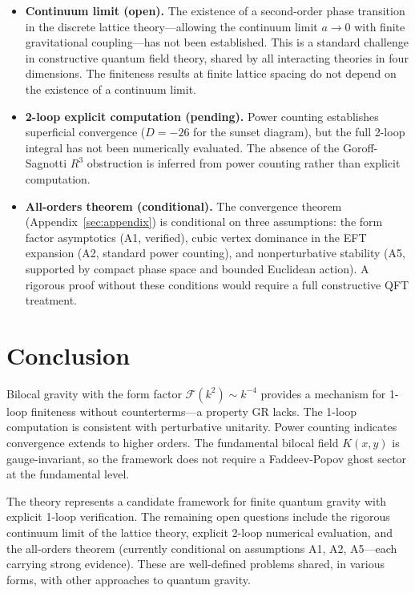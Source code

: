 \documentclass[aps,prd,reprint,nofootinbib]{revtex4-2}
\begin{document}
\begin{itemize}
\item \textbf{Continuum limit (open).} The existence of a second-order phase transition in the discrete lattice theory---allowing the continuum limit $a\to 0$ with finite gravitational coupling---has not been established. This is a standard challenge in constructive quantum field theory, shared by all interacting theories in four dimensions. The finiteness results at finite lattice spacing do not depend on the existence of a continuum limit.
\item \textbf{2-loop explicit computation (pending).} Power counting establishes superficial convergence ($D = -26$ for the sunset diagram), but the full 2-loop integral has not been numerically evaluated. The absence of the Goroff-Sagnotti $R^3$ obstruction is inferred from power counting rather than explicit computation.
\item \textbf{All-orders theorem (conditional).} The convergence theorem (Appendix~\ref{sec:appendix}) is conditional on three assumptions: the form factor asymptotics (A1, verified), cubic vertex dominance in the EFT expansion (A2, standard power counting), and nonperturbative stability (A5, supported by compact phase space and bounded Euclidean action). A rigorous proof without these conditions would require a full constructive QFT treatment.
\end{itemize}

\section{Conclusion}
\label{sec:conclusion}

Bilocal gravity with the form factor $\mathcal{F}(k^2) \sim k^{-4}$ provides a mechanism for 1-loop finiteness without counterterms---a property GR lacks. The 1-loop computation is consistent with perturbative unitarity. Power counting indicates convergence extends to higher orders. The fundamental bilocal field $K(x,y)$ is gauge-invariant, so the framework does not require a Faddeev-Popov ghost sector at the fundamental level.

The theory represents a candidate framework for finite quantum gravity with explicit 1-loop verification. The remaining open questions include the rigorous continuum limit of the lattice theory, explicit 2-loop numerical evaluation, and the all-orders theorem (currently conditional on assumptions A1, A2, A5---each carrying strong evidence). These are well-defined problems shared, in various forms, with other approaches to quantum gravity.
\end{document}
